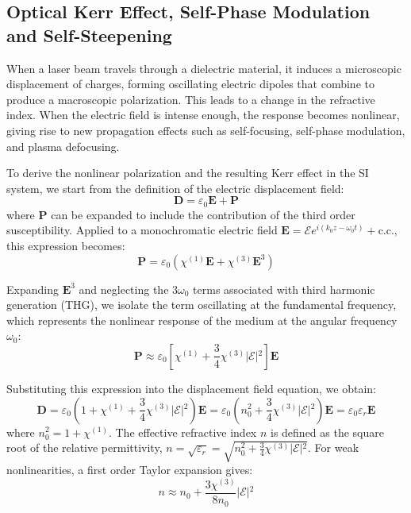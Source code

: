 \subsection{Optical Kerr Effect, Self-Phase Modulation and Self-Steepening}

When a laser beam travels through a dielectric material, it induces a microscopic displacement of charges, forming oscillating electric dipoles that combine to produce a macroscopic polarization. This leads to a change in the refractive index. When the electric field is intense enough, the response becomes nonlinear, giving rise to new propagation effects such as self-focusing, self-phase modulation, and plasma defocusing.

To derive the nonlinear polarization and the resulting Kerr effect in the SI system, we start from the definition of the electric displacement field:
\begin{equation}
\mathbf{D} = \varepsilon_0 \mathbf{E} + \mathbf{P}
\end{equation}
where $\mathbf{P}$ can be expanded to include the contribution of the third order susceptibility. Applied to a monochromatic electric field $\mathbf{E} = \mathcal{E}e^{i(k_0z-\omega_0t)} + \text{c.c.}$, this expression becomes:
\begin{equation}
\mathbf{P} = \varepsilon_0 \left( \chi^{(1)}\mathbf{E} + \chi^{(3)}\mathbf{E}^3 \right)
\end{equation}

Expanding $\mathbf{E}^3$ and neglecting the $3\omega_0$ terms associated with third harmonic generation (THG), we isolate the term oscillating at the fundamental frequency, which represents the nonlinear response of the medium at the angular frequency $\omega_0$:
\begin{equation}
\mathbf{P} \approx \varepsilon_0 \left[ \chi^{(1)} + \frac{3}{4}\chi^{(3)}\vert{}\mathcal{E}\vert{}^2 \right] \mathbf{E}
\end{equation}

Substituting this expression into the displacement field equation, we obtain:
\begin{equation}
\mathbf{D} = \varepsilon_0 \left( 1 + \chi^{(1)} + \frac{3}{4}\chi^{(3)}\vert{}\mathcal{E}\vert{}^2 \right) \mathbf{E} = \varepsilon_0 \left( n_0^2 + \frac{3}{4}\chi^{(3)}\vert{}\mathcal{E}\vert{}^2 \right) \mathbf{E} = \varepsilon_0 \varepsilon_r \mathbf{E}
\end{equation}
where $n_0^2 = 1 + \chi^{(1)}$. The effective refractive index $n$ is defined as the square root of the relative permittivity, $n = \sqrt{\varepsilon_r} = \sqrt{n_0^2 + \frac{3}{4}\chi^{(3)}\vert{}\mathcal{E}\vert{}^2}$. For weak nonlinearities, a first order Taylor expansion gives:
\begin{equation}
n \approx n_0 + \frac{3\chi^{(3)}}{8n_0}\vert{}\mathcal{E}\vert{}^2
\end{equation}

